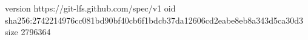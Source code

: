 version https://git-lfs.github.com/spec/v1
oid sha256:2742214976cc081bd90bf40cb6f1bdcb37da12606cd2eabe8eb8a343d5ca30d3
size 2796364
